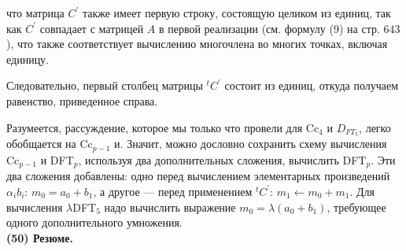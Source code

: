 \documentclass{mai_book}
\begin{document}
что матрица $C^{'}$ также имеет первую строку, состоящую целиком из единиц, так как $C^{'}$  совпадает с матрицей $A$ в первой реализации (см. формулу ($9$) на стр. $643$), что также  соответствует вычислению многочлена во многих точках, включая единицу. \\ \par
Следовательно, первый столбец матрицы $^{t}C^{'}$ состоит из единиц,  откуда получаем равенство, приведенное справа. \par
Разумеется, рассуждение, которое мы только что провели для Cc$_4$ и $D_{FT_5}$, легко обобщается на Cc$_{p-1}$ и. Значит, можно дословно сохранить схему вычисления Cc$_{p-1}$ и DFT$_p$, используя два дополнительных 
сложения, вычислить DFT$_p$. Эти два сложения добавлены: одно перед вычислением элементарных произведений ${\alpha}_i b_i$: $m_0 = a_0 + b_1$, а другое --- перед применением $^{t}C^{'}$: $m_1 \leftarrow m_0 + m_1$. Для вычисления $\lambda$DFT$_5$ надо вычислить выражение $m_0 = \lambda (a_0 + b_1)$, требующее одного дополнительного умножения. \\

\textbf{(50) Резюме.} \\
\end{document}
